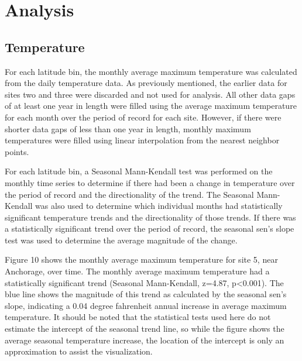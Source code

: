 \documentclass[12pt,]{article}
\begin{document}
\newpage

\hypertarget{analysis}{%
\section{Analysis}\label{analysis}}

\hypertarget{temperature-1}{%
\subsection{Temperature}\label{temperature-1}}

For each latitude bin, the monthly average maximum temperature was
calculated from the daily temperature data. As previously mentioned, the
earlier data for sites two and three were discarded and not used for
analysis. All other data gaps of at least one year in length were filled
using the average maximum temperature for each month over the period of
record for each site. However, if there were shorter data gaps of less
than one year in length, monthly maximum temperatures were filled using
linear interpolation from the nearest neighbor points.

For each latitude bin, a Seasonal Mann-Kendall test was performed on the
monthly time series to determine if there had been a change in
temperature over the period of record and the directionality of the
trend. The Seasonal Mann-Kendall was also used to determine which
individual months had statistically significant temperature trends and
the directionality of those trends. If there was a statistically
significant trend over the period of record, the seasonal sen's slope
test was used to determine the average magnitude of the change.

Figure 10 shows the monthly average maximum temperature for site 5, near
Anchorage, over time. The monthly average maximum temperature had a
statistically significant trend (Seasonal Mann-Kendall, z=4.87,
p\textless{}0.001). The blue line shows the magnitude of this trend as
calculated by the seasonal sen's slope, indicating a 0.04 degree
fahrenheit annual increase in average maximum temperature. It should be
noted that the statistical tests used here do not estimate the intercept
of the seasonal trend line, so while the figure shows the average
seasonal temperature increase, the location of the intercept is only an
approximation to assist the visualization.
\end{document}

